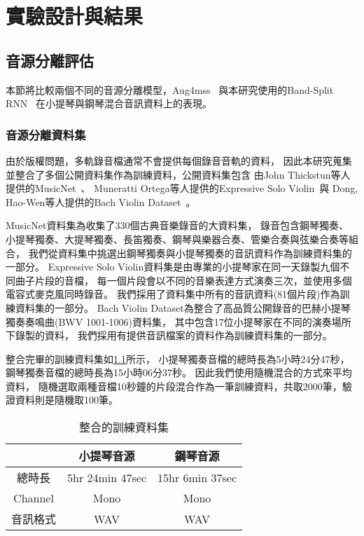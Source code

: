 \documentclass[class=NCU_thesis, crop=false]{standalone}
\begin{document}
\chapter{實驗設計與結果}

\section{音源分離評估}
本節將比較兩個不同的音源分離模型，Aug4mss~\cite{Chiu_ChingYu2020MixingSpecific}
與本研究使用的Band-Split RNN~\cite{Luo_Yi2022MusicSourceSeparation}
在小提琴與鋼琴混合音訊資料上的表現。

\subsection{音源分離資料集}
由於版權問題，多軌錄音檔通常不會提供每個錄音音軌的資料，
因此本研究蒐集並整合了多個公開資料集作為訓練資料，公開資料集包含
由John Thickstun等人提供的MusicNet~\cite{Thickstun2017Learning, Thickstun2018Invariances}、
Muneratti Ortega等人提供的Expressive Solo Violin~\cite{Muneratti_Ortega2021Expressive}與
Dong, Hao-Wen等人提供的Bach Violin Dataset~\cite{Dong_HaoWen2021Bach}。

MusicNet資料集為收集了330個古典音樂錄音的大資料集，
錄音包含鋼琴獨奏、小提琴獨奏、大提琴獨奏、長笛獨奏、鋼琴與樂器合奏、管樂合奏與弦樂合奏等組合，
我們從資料集中挑選出鋼琴獨奏與小提琴獨奏的音訊資料作為訓練資料集的一部分。
Expressive Solo Violin資料集是由專業的小提琴家在同一天錄製九個不同曲子片段的音檔，
每一個片段會以不同的音樂表達方式演奏三次，並使用多個電容式麥克風同時錄音。
我們採用了資料集中所有的音訊資料(81個片段)作為訓練資料集的一部分。
Bach Violin Dataset為整合了高品質公開錄音的巴赫小提琴獨奏奏鳴曲(BWV 1001-1006)資料集，
其中包含17位小提琴家在不同的演奏場所下錄製的資料，
我們採用有提供音訊檔案的資料作為訓練資料集的一部分。

整合完畢的訓練資料集如\cref{table:table-ours-training-dataset}所示，
小提琴獨奏音檔的總時長為5小時24分47秒，鋼琴獨奏音檔的總時長為15小時06分37秒。
因此我們使用隨機混合的方式來平均資料，
隨機選取兩種音檔10秒鐘的片段混合作為一筆訓練資料，共取2000筆，驗證資料則是隨機取100筆。

\begin{table}[h]
    \centering
    \caption{整合的訓練資料集}
    \label{table:table-ours-training-dataset}
    \begin{tabular}{|c|c|c|}
        \hline
        \multicolumn{1}{|c|}{} & \multicolumn{1}{|c|}{小提琴音源} & \multicolumn{1}{|c|}{鋼琴音源} \\
        \hline
        總時長 & 5hr 24min 47sec & 15hr 6min 37sec \\
        \hline
        Channel & Mono & Mono \\
        \hline
        音訊格式 & WAV & WAV \\
        \hline
    \end{tabular}
\end{table}
\end{document}
